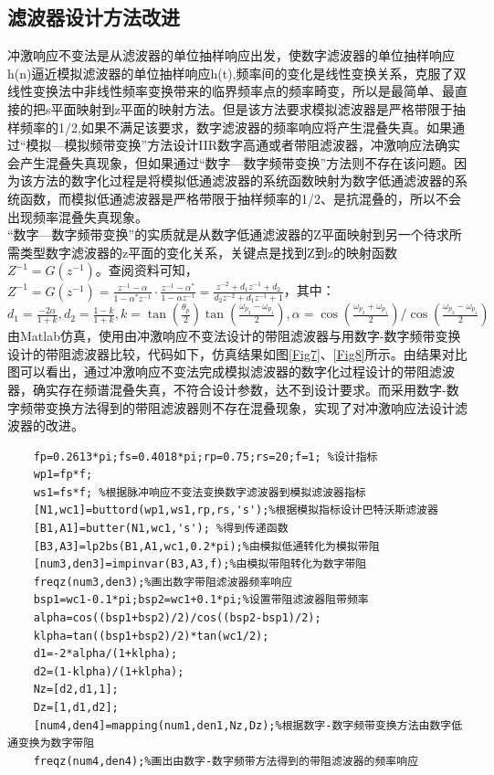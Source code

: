 \documentclass{seuer}
\begin{document}
\subsection{滤波器设计方法改进}
冲激响应不变法是从滤波器的单位抽样响应出发，使数字滤波器的单位抽样响应h(n)逼近模拟滤波器的单位抽样响应h(t),频率间的变化是线性变换关系，克服了双线性变换法中非线性频率变换带来的临界频率点的频率畸变，所以是最简单、最直接的把s平面映射到z平面的映射方法。但是该方法要求模拟滤波器是严格带限于抽样频率的1/2,如果不满足该要求，数字滤波器的频率响应将产生混叠失真。如果通过“模拟—模拟频带变换”方法设计IIR数字高通或者带阻滤波器，冲激响应法确实会产生混叠失真现象，但如果通过“数字—数字频带变换”方法则不存在该问题。因为该方法的数字化过程是将模拟低通滤波器的系统函数映射为数字低通滤波器的系统函数，而模拟低通滤波器是严格带限于抽样频率的1/2、是抗混叠的，所以不会出现频率混叠失真现象。
\\“数字—数字频带变换”的实质就是从数字低通滤波器的Z平面映射到另一个待求所需类型数字滤波器的z平面的变化关系，关键点是找到Z到z的映射函数$Z^{-1}=G(z^{-1})$。查阅资料可知，$
Z^{-1}=G\left(z^{-1}\right)=\frac{z^{-1}-\alpha}{1-\alpha^* z^{-1}} \cdot \frac{z^{-1}-\alpha^*}{1-\alpha z^{-1}}=\frac{z^{-2}+d_1 z^{-1}+d_2}{d_2 z^{-2}+d_1 z^{-1}+1}$，其中：$d_1=\frac{-2 \alpha}{1+k},d_2=\frac{1-k}{1+k},
k=\tan \left(\frac{\theta_p}{2}\right) \tan \left(\frac{\omega_{p_2}-\omega_{p_1}}{2}\right),
\alpha=\cos \left(\frac{\omega_{p_2}+\omega_{p_1}}{2}\right) / \cos \left(\frac{\omega_{p_2}-\omega_{p_1}}{2}\right)
$由Matlab仿真，使用由冲激响应不变法设计的带阻滤波器与用数字-数字频带变换设计的带阻滤波器比较，代码如下，仿真结果如图\ref{Fig7}、\ref{Fig8}所示。由结果对比图可以看出，通过冲激响应不变法完成模拟滤波器的数字化过程设计的带阻滤波器，确实存在频谱混叠失真，不符合设计参数，达不到设计要求。而采用数字-数字频带变换方法得到的带阻滤波器则不存在混叠现象，实现了对冲激响应法设计滤波器的改进。
\lstset{language=Matlab}
\begin{lstlisting}
	fp=0.2613*pi;fs=0.4018*pi;rp=0.75;rs=20;f=1; %设计指标
	wp1=fp*f;
	ws1=fs*f; %根据脉冲响应不变法变换数字滤波器到模拟滤波器指标
	[N1,wc1]=buttord(wp1,ws1,rp,rs,'s');%根据模拟指标设计巴特沃斯滤波器
	[B1,A1]=butter(N1,wc1,'s'); %得到传递函数
	[B3,A3]=lp2bs(B1,A1,wc1,0.2*pi);%由模拟低通转化为模拟带阻
	[num3,den3]=impinvar(B3,A3,f);%由模拟带阻转化为数字带阻
	freqz(num3,den3);%画出数字带阻滤波器频率响应
	bsp1=wc1-0.1*pi;bsp2=wc1+0.1*pi;%设置带阻滤波器阻带频率
	alpha=cos((bsp1+bsp2)/2)/cos((bsp2-bsp1)/2);
	klpha=tan((bsp1+bsp2)/2)*tan(wc1/2);
	d1=-2*alpha/(1+klpha);
	d2=(1-klpha)/(1+klpha);
	Nz=[d2,d1,1];
	Dz=[1,d1,d2];
	[num4,den4]=mapping(num1,den1,Nz,Dz);%根据数字-数字频带变换方法由数字低通变换为数字带阻
	freqz(num4,den4);%画出由数字-数字频带方法得到的带阻滤波器的频率响应
\end{lstlisting}
\end{document}
